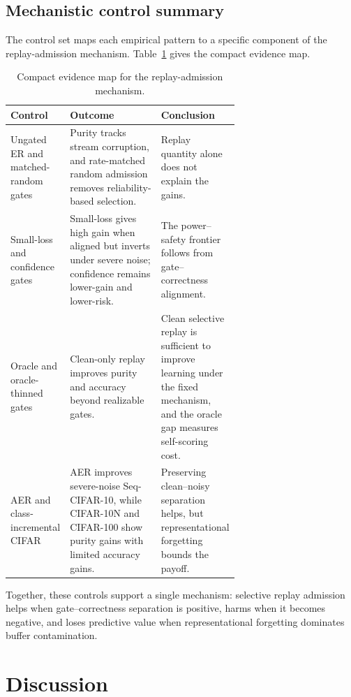 \documentclass[preprint,12pt]{elsarticle}
\begin{document}
\subsection{Mechanistic control summary}
The control set maps each empirical pattern to a specific component of the replay-admission mechanism. Table~\ref{tab:control_summary} gives the compact evidence map.

\begin{table}[t]
\centering
\caption{Compact evidence map for the replay-admission mechanism.}
\label{tab:control_summary}
\small
\renewcommand{\arraystretch}{1.2}
\begin{tabularx}{\linewidth}{%
  >{\raggedright\arraybackslash}p{0.22\linewidth}%
  >{\raggedright\arraybackslash}p{0.43\linewidth}%
  >{\raggedright\arraybackslash}X}
\toprule
\textbf{Control} & \textbf{Outcome} & \textbf{Conclusion} \\
\midrule
Ungated ER and matched-random gates &
Purity tracks stream corruption, and rate-matched random admission removes reliability-based selection. &
Replay quantity alone does not explain the gains. \\
\midrule
Small-loss and confidence gates &
Small-loss gives high gain when aligned but inverts under severe noise; confidence remains lower-gain and lower-risk. &
The power--safety frontier follows from gate--correctness alignment. \\
\midrule
Oracle and oracle-thinned gates &
Clean-only replay improves purity and accuracy beyond realizable gates. &
Clean selective replay is sufficient to improve learning under the fixed mechanism, and the oracle gap measures self-scoring cost. \\
\midrule
AER and class-incremental CIFAR &
AER improves severe-noise Seq-CIFAR-10, while CIFAR-10N and CIFAR-100 show purity gains with limited accuracy gains. &
Preserving clean--noisy separation helps, but representational forgetting bounds the payoff. \\
\bottomrule
\end{tabularx}
\end{table}

Together, these controls support a single mechanism: selective replay admission helps when gate--correctness separation is positive, harms when it becomes negative, and loses predictive value when representational forgetting dominates buffer contamination.

\section{Discussion}
\end{document}
